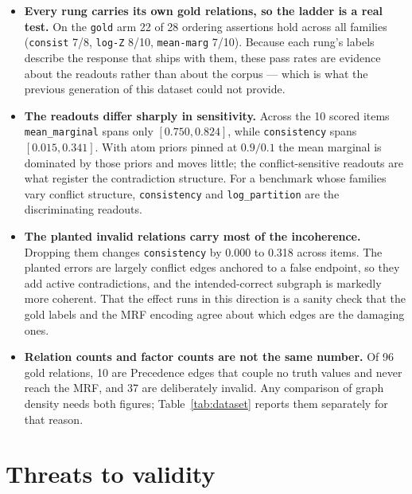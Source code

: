 \documentclass[11pt]{article}
\begin{document}
\begin{itemize}
\item \textbf{Every rung carries its own gold relations, so the ladder is a real test.} On the \texttt{gold} arm 22 of 28 ordering assertions hold across all families (\texttt{consist} 7/8, \texttt{log-Z} 8/10, \texttt{mean-marg} 7/10). Because each rung's labels describe the response that ships with them, these pass rates are evidence about the readouts rather than about the corpus --- which is what the previous generation of this dataset could not provide.
\item \textbf{The readouts differ sharply in sensitivity.} Across the 10 scored items \texttt{mean\_marginal} spans only $[0.750, 0.824]$, while \texttt{consistency} spans $[0.015, 0.341]$. With atom priors pinned at $0.9/0.1$ the mean marginal is dominated by those priors and moves little; the conflict-sensitive readouts are what register the contradiction structure. For a benchmark whose families vary conflict structure, \texttt{consistency} and \texttt{log\_partition} are the discriminating readouts.
\item \textbf{The planted invalid relations carry most of the incoherence.} Dropping them changes \texttt{consistency} by 0.000 to 0.318 across items. The planted errors are largely conflict edges anchored to a false endpoint, so they add active contradictions, and the intended-correct subgraph is markedly more coherent. That the effect runs in this direction is a sanity check that the gold labels and the MRF encoding agree about which edges are the damaging ones.
\item \textbf{Relation counts and factor counts are not the same number.} Of 96 gold relations, 10 are Precedence edges that couple no truth values and never reach the MRF, and 37 are deliberately invalid. Any comparison of graph density needs both figures; Table~\ref{tab:dataset} reports them separately for that reason.
\end{itemize}

\section{Threats to validity}
\end{document}
